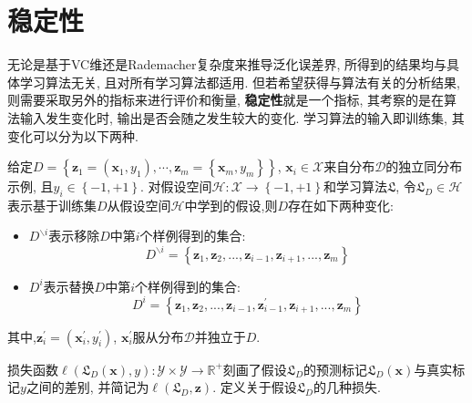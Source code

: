 \section{稳定性}
无论是基于VC维还是Rademacher复杂度来推导泛化误差界, 所得到的结果均与具体学习算法无关, 且对所有学习算法都适用. 但若希望获得与算法有关的分析结果, 则需要采取另外的指标来进行评价和衡量, \textbf{稳定性}就是一个指标, 其考察的是在算法输入发生变化时, 输出是否会随之发生较大的变化. 学习算法的输入即训练集, 其变化可以分为以下两种.
\par
给定$D=\left\{ \boldsymbol{z}_1=\left( \boldsymbol{x}_1,y_1 \right) ,\cdots ,\boldsymbol{z}_m=\left\{ \boldsymbol{x}_m,y_m \right\} \right\} $, $\boldsymbol{x}_i\in \mathcal{X}$来自分布$\mathcal{D}$的独立同分布示例, 且$y_i\in \left\{ -1,+1 \right\} $. 对假设空间$\mathcal{H}:\mathcal{X}\rightarrow \left\{ -1,+1 \right\} $和学习算法$\mathfrak{L}$, 令$\mathfrak{L}_D\in \mathcal{H}$表示基于训练集$D$从假设空间$\mathcal{H}$中学到的假设,则$D$存在如下两种变化:
\begin{itemize}
  \item $D^{\backslash i}$表示移除$D$中第$i$个样例得到的集合: \\
  \begin{equation}
  D^{\backslash i}=\left\{ \boldsymbol{z}_1,\boldsymbol{z}_2,...,\boldsymbol{z}_{i-1},\boldsymbol{z}_{i+1},...,\boldsymbol{z}_m \right\}
  \end{equation}
  \item $D^{ i}$表示替换$D$中第$i$个样例得到的集合: \\
\begin{equation}
  D^{ i}=\left\{ \boldsymbol{z}_1,\boldsymbol{z}_2,...,\boldsymbol{z}_{i-1},\boldsymbol{z}_{i-1}^{'},\boldsymbol{z}_{i+1},...,\boldsymbol{z}_m \right\}
  \end{equation}
\end{itemize}
其中,$\boldsymbol{z}_{i}^{'}=\left( \boldsymbol{x}_{i}^{'},y_{i}^{'} \right) $, $ \boldsymbol{x}_{i}^{'}$服从分布$\mathcal{D}$并独立于$D$.
\par
损失函数$\ell \left( \mathfrak{L}_D\left( \boldsymbol{x} \right) ,y \right) :\mathcal{Y}\times \mathcal{Y}\rightarrow \mathbb{R}^+ $刻画了假设$\mathfrak{L}_D$的预测标记$\mathfrak{L}_D\left( \boldsymbol{x} \right)$与真实标记$y$之间的差别, 并简记为$\ell \left( \mathfrak{L}_D,\boldsymbol{z}\right) $. 定义关于假设$\mathfrak{L}_D$的几种损失.

